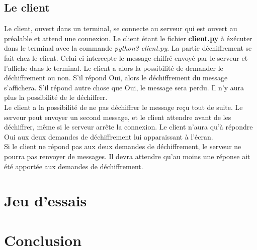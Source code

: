 \documentclass[12pt]{article}
\theoremstyle{definition}
\begin{document}
	\subsection{Le client}
	Le client, ouvert dans un terminal, se connecte au serveur qui est ouvert au préalable et attend une connexion. Le client étant le fichier \textbf{client.py} à éxécuter dans le terminal avec la commande \textit{python3 client.py}. La partie déchiffrement se fait chez le client. Celui-ci intercepte le message chiffré envoyé par le serveur et l'affiche dans le terminal. Le client a alors la possibilité de demander le déchiffrement ou non. S'il répond Oui, alors le déchiffrement du message s'affichera. S'il répond autre chose que Oui, le message sera perdu. Il n'y aura plus la possibilité de le déchiffrer.\\
Le client a la possibilité de ne pas déchiffrer le message reçu tout de suite. Le serveur peut envoyer un second message, et le client attendre avant de les déchiffrer, même si le serveur arrête la connexion. Le client n'aura qu'à répondre Oui aux deux demandes de déchiffrement lui apparaissant à l'écran.\\
Si le client ne répond pas aux deux demandes de déchiffrement, le serveur ne pourra pas renvoyer de messages. Il devra attendre qu'au moins une réponse ait été apportée aux demandes de déchiffrement. 
	
\vfill \eject
\section{Jeu d'essais}

\section{Conclusion}
\end{document}
